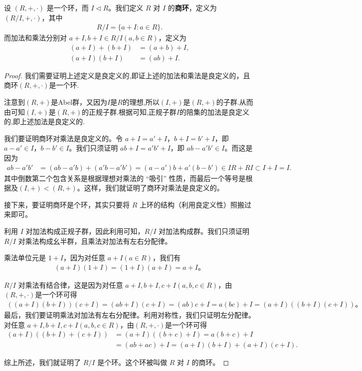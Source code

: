 \documentclass[../../main.tex]{subfiles}
\begin{document}
\begin{definition}[商环]\label{definition:商环}
设 $(R, +, \cdot)$ 是一个环，而 $I \lhd R$。我们定义 $R$ 对 $I$ 的\textbf{商环}，定义为 $(R/I, +, \cdot)$，其中
\begin{align*}
R/I = \{a + I : a \in R\}.
\end{align*}
而加法和乘法分别对 $a + I, b + I \in R/I (a, b \in R)$，定义为
\begin{align*}
(a + I) + (b + I) &= (a + b) + I,\\
(a + I)(b + I) &= (ab) + I.
\end{align*} 
\end{definition}
\begin{proof}
我们需要证明上述定义是良定义的,即证上述的加法和乘法是良定义的，且商环$(R,+,\cdot)$是一个环.

注意到$(R,+)$是Abel群，又因为$I$是$R$的理想,所以$(I,+)$是$(R,+)$的子群.从而由可知$(I,+)$是$(R,+)$的正规子群.根据可知,正规子群$I$的陪集的加法是良定义的,即上述加法是良定义的.

我们要证明商环对乘法是良定义的。令 $a + I = a' + I$，$b + I = b' + I$，即 $a - a' \in I$，$b - b' \in I$。我们只须证明 $ab + I = a'b' + I$，即 $ab - a'b' \in I$。而这是因为
\begin{align*}
ab - a'b' &= (ab - a'b) + (a'b - a'b') = (a - a')b + a'(b - b') \in IR + RI \subset I + I = I .
\end{align*}
其中倒数第二个包含关系是根据理想对乘法的 “吸引” 性质，而最后一个等号是根据及$(I,+)<(R,+)$。这样，我们就证明了商环对乘法是良定义的。

接下来，要证明商环是个环，其实只要将 $R$ 上环的结构（利用良定义性）照搬过来即可。

利用 $I$ 对加法构成正规子群，因此利用可知，$R/I$ 对加法构成群。我们只须证明 $R/I$ 对乘法构成幺半群，且乘法对加法有左右分配律。

乘法单位元是 $1 + I$，因为对任意 $a + I (a \in R)$，我们有
\begin{align*}
(a + I)(1 + I) = (1 + I)(a + I) = a + I 。
\end{align*}

$R/I$ 对乘法有结合律，这是因为对任意 $a + I, b + I, c + I (a, b, c \in R)$，由$(R,+,\cdot)$是一个环可得
\begin{align*}
((a + I)(b + I))(c + I) = (ab + I)(c + I) = (ab)c + I = a(bc) + I = (a + I)((b + I)(c + I)) 。
\end{align*}
最后，我们要证明乘法对加法有左右分配律。利用对称性，我们只证明左分配律。对任意 $a + I, b + I, c + I (a, b, c \in R)$，由$(R,+,\cdot)$是一个环可得
\begin{align*}
(a + I)((b + I) + (c + I)) &= (a + I)((b + c) + I) = a(b + c) + I \\
&= (ab + ac) + I = (a + I)(b + I) + (a + I)(c + I).
\end{align*}

综上所述，我们就证明了 $R/I$ 是个环。这个环被叫做 $R$ 对 $I$ 的商环。 
\end{proof}
\end{document}
